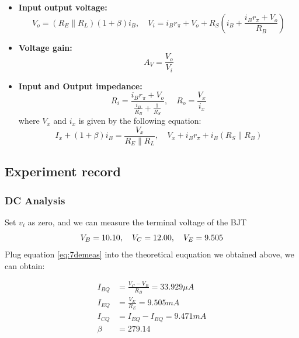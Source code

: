 \begin{enumerate}[I]
            \begin{itemize}
                \item \textbf{Input output voltage:}
                \[
                    V_o = (R_E \parallel R_L)(1+\beta) i_B, \quad
                    V_i = i_B r_\pi + V_o + R_S \left(i_B + \frac{i_B r_\pi + V_o}{R_B}\right)
                \]
                \item \textbf{Voltage gain:}
                \[
                    A_V = \frac{V_o}{V_i}
                \]
                \item \textbf{Input and Output impedance:}
                \[
                    R_i = \frac{i_B r_\pi + V_o}{\frac{i_B}{R_B} + \frac{1}{R_S}}, \quad
                    R_o = \frac{V_x}{i_x}
                \]
                where $V_x$ and $i_x$ is given by the following equation:
                \[
                    I_x + (1+\beta)i_B = \frac{V_x}{R_E \parallel R_L}, \quad
                    V_x + i_B r_\pi + i_B(R_S \parallel R_B)
                \]
            \end{itemize}
    \end{enumerate}

\subsection{Experiment record}
\subsubsection{DC Analysis}
Set $v_i$ as zero, and we can measure the terminal voltage of the BJT\\
    \begin{equation}
    \centering
            V_B =10.10,\quad
            V_C =12.00,\quad
            V_E =9.505
            \label{eq:7demeas}
    \end{equation}
    Plug equation \ref{eq:7demeas} into the theoretical euquation we obtained above, we can obtain:

        \begin{align*}
            I_{BQ} & = \frac{V_C-V_B}{R_B}=33.929\mu A\\
            I_{EQ} & = \frac{V_E}{R_E}=9.505mA\\
            I_{CQ} & = I_{EQ}-I_{BQ}=9.471mA\\
            \beta  & = 279.14
        \end{align*}


